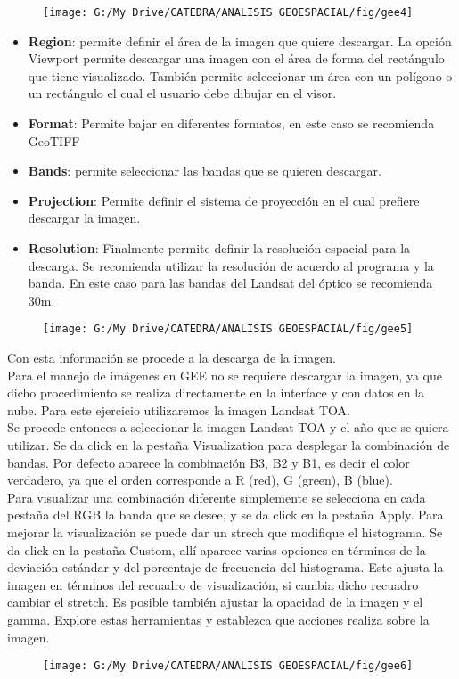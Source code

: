 \documentclass[a4paper,oneside,11pt,]{article}
\begin{document}
\begin{figure}
\texttt{[image: G:/My Drive/CATEDRA/ANALISIS GEOESPACIAL/fig/gee4]}
\end{figure}

\begin{itemize}
\item \textbf{Region}: permite definir el área de la imagen que quiere descargar. La opción Viewport permite descargar una imagen con el área de forma del rectángulo que tiene visualizado. También permite seleccionar un área con un polígono o un rectángulo el cual el usuario debe dibujar en el visor.
\item \textbf{Format}: Permite bajar en diferentes formatos, en este caso se recomienda GeoTIFF
\item \textbf{Bands}: permite seleccionar las bandas que se quieren descargar.
\item \textbf{Projection}: Permite definir el sistema de proyección en el cual prefiere descargar la imagen.
\item \textbf{Resolution}: Finalmente permite definir la resolución espacial para la descarga. Se recomienda utilizar la resolución de acuerdo al programa y la banda. En este caso para las bandas del Landsat del óptico se recomienda 30m.
\end{itemize}

\begin{figure}
\centering
\texttt{[image: G:/My Drive/CATEDRA/ANALISIS GEOESPACIAL/fig/gee5]}
\end{figure}

Con esta información se procede a la descarga de la imagen.\\
Para el manejo de imágenes en GEE no se requiere descargar la imagen, ya que dicho procedimiento se realiza directamente en la interface y con datos en la nube. Para este ejercicio utilizaremos la imagen Landsat TOA.\\
Se procede entonces a seleccionar la imagen Landsat TOA y el año que se quiera utilizar. Se da click en la pestaña Visualization para desplegar la combinación de bandas. Por defecto aparece la combinación B3, B2 y B1, es decir el color verdadero, ya que el orden corresponde a R (red), G (green), B (blue).\\
Para visualizar una combinación diferente simplemente se selecciona en cada pestaña del RGB la banda que se desee, y se da click en la pestaña Apply.
Para mejorar la visualización se puede dar un strech que modifique el histograma. Se da click en la pestaña Custom, allí aparece varias opciones en términos de la deviación estándar y del porcentaje de frecuencia del histograma. Este ajusta la imagen en términos del recuadro de visualización, si cambia dicho recuadro cambiar el stretch.
Es posible también ajustar la opacidad de la imagen y el gamma. Explore estas herramientas y establezca que acciones realiza sobre la imagen.
\begin{figure}
\centering
\texttt{[image: G:/My Drive/CATEDRA/ANALISIS GEOESPACIAL/fig/gee6]}
\end{figure}
\end{document}

